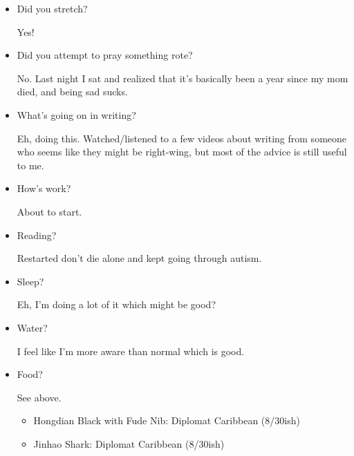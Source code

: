 \documentclass[12pt]{article}
\renewcommand{\,}{\textsuperscript{,}}
\begin{document}
\begin{itemize}

\item Did you stretch?

Yes!

\item Did you attempt to pray something rote?

No. Last night I sat and realized that it's basically been a year since my mom died, and being sad sucks.

\item What's going on in writing?

Eh, doing this.  
Watched/listened to a few videos about writing from someone who seems like they might be right-wing, but most of the advice is still useful to me.

\item How's work?

About to start.

\item Reading?

Restarted don't die alone and kept going through autism.

\item Sleep?

Eh, I'm doing a lot of it which might be good?

\item Water?

I feel like I'm more aware than normal which is good.

\item Food?

See above.

\begin{itemize}  
\item Hongdian Black with Fude Nib: Diplomat Caribbean (8/30ish)  
\item Jinhao Shark: Diplomat Caribbean (8/30ish)

\end{itemize}

\end{itemize}
\end{document}
